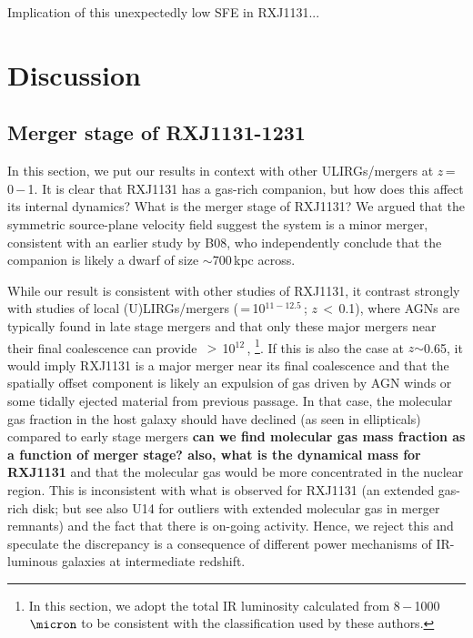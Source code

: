 \documentclass[]{emulateapj}
\begin{document}
Implication of this unexpectedly low SFE in RXJ1131...




\section{Discussion} \label{sec:diss}
\subsection{Merger stage of RXJ1131-1231}
In this section, we put our results in context with other ULIRGs/mergers at
$z$\,=\,0\,$-$\,1. It is clear that RXJ1131 has a
gas-rich companion, but how does this affect its internal dynamics?
What is the merger stage of RXJ1131?
We argued that the symmetric source-plane velocity field suggest
the system is a minor merger, consistent with an earlier study by B08, who
independently conclude that the companion is likely
a dwarf of size $\sim$700\,kpc across.

While our result is consistent with other studies of RXJ1131, it
contrast strongly with studies of local (U)LIRGs/mergers
(\LIR\,=\,10$^{11-12.5}$\,\Lsun; $z$\,$<$\,0.1), where AGNs are
typically found in late stage mergers
\citep{Yuan10a,Iwasawa11a,Carpineti12a} and
that only these major mergers near their final
coalescence can provide \LIR\,$>$\,10$^{12}$\,\Lsun,
\citep[\eg][hereafter L16]{Carpineti15a,Larson16a}
\footnote{In this section, we adopt the total IR luminosity
calculated from 8\,$-$\,1000\,$\micron$
to be consistent with the classification used by these authors.}.
If this is also the case at $z$$\sim$0.65, it would imply RXJ1131
is a major merger near its final coalescence and that the spatially offset
component is likely an expulsion of gas driven by AGN winds or some
tidally ejected material from previous passage.
In that case, the molecular gas fraction in the host
galaxy should have declined (as seen in ellipticals) compared to early
stage mergers
\textbf{can we find molecular gas mass fraction as a
function of merger stage? also, what is the dynamical mass for RXJ1131}
and that the molecular gas would
be more concentrated in the nuclear region.
This is inconsistent with what
is observed for RXJ1131
(an extended gas-rich disk; but see also U14 for outliers
with extended molecular gas in merger remnants) and
the fact that there is on-going \SF activity.
Hence, we reject this and speculate the discrepancy is a consequence
of different power mechanisms of IR-luminous galaxies at intermediate redshift.
\end{document}
